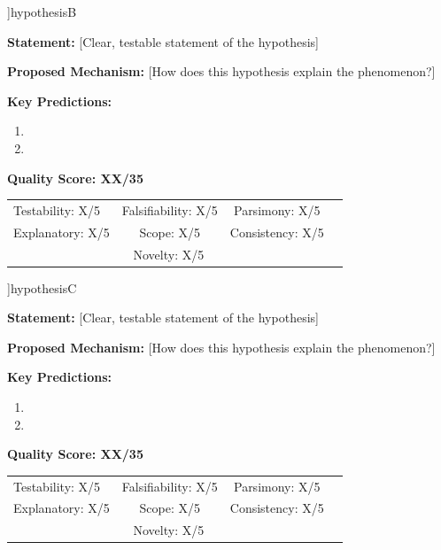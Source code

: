 \documentclass[11pt,a4paper]{article}
\begin{document}
\begin{hypothesisbox}[H2: [Hypothesis Name]]{hypothesisB}

\textbf{Statement:} [Clear, testable statement of the hypothesis]

\textbf{Proposed Mechanism:} [How does this hypothesis explain the phenomenon?]

\textbf{Key Predictions:}
\begin{enumerate}
    \item [Prediction 1]
    \item [Prediction 2]
\end{enumerate}

\textbf{Quality Score: XX/35}
\begin{center}
\footnotesize
\begin{tabular}{lccc}
Testability: X/5 & Falsifiability: X/5 & Parsimony: X/5 \\
Explanatory: X/5 & Scope: X/5 & Consistency: X/5 \\
\multicolumn{3}{c}{Novelty: X/5}
\end{tabular}
\end{center}
\end{hypothesisbox}

\newpage

\begin{hypothesisbox}[H3: [Hypothesis Name]]{hypothesisC}

\textbf{Statement:} [Clear, testable statement of the hypothesis]

\textbf{Proposed Mechanism:} [How does this hypothesis explain the phenomenon?]

\textbf{Key Predictions:}
\begin{enumerate}
    \item [Prediction 1]
    \item [Prediction 2]
\end{enumerate}

\textbf{Quality Score: XX/35}
\begin{center}
\footnotesize
\begin{tabular}{lccc}
Testability: X/5 & Falsifiability: X/5 & Parsimony: X/5 \\
Explanatory: X/5 & Scope: X/5 & Consistency: X/5 \\
\multicolumn{3}{c}{Novelty: X/5}
\end{tabular}
\end{center}
\end{hypothesisbox}
\end{document}
